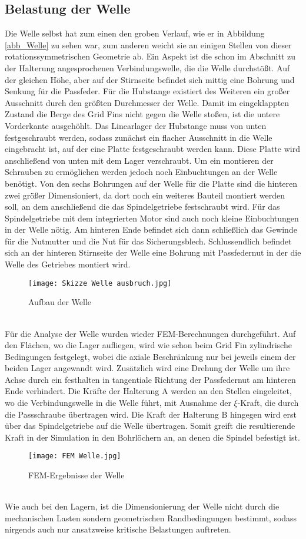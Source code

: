 \subsection{Belastung der Welle}
Die Welle selbst hat zum einen den groben Verlauf, wie er in Abbildung \ref{abb_Welle} zu sehen war, zum anderen weicht sie an einigen Stellen von dieser rotationssymmetrischen Geometrie ab. Ein Aspekt ist die schon im Abschnitt zu der Halterung angesprochenen Verbindungswelle, die die Welle durchstößt. Auf der gleichen Höhe, aber auf der Stirnseite befindet sich mittig eine Bohrung und Senkung für die Passfeder. Für die Hubstange existiert des Weiteren ein großer Ausschnitt durch den größten Durchmesser der Welle. Damit im eingeklappten Zustand die Berge des Grid Fins nicht gegen die Welle stoßen, ist die untere Vorderkante ausgehöhlt. Das Linearlager der Hubstange muss von unten festgeschraubt werden, sodass zunächst ein flacher Ausschnitt in die Welle eingebracht ist, auf der eine Platte festgeschraubt werden kann. Diese Platte wird anschließend von unten mit dem Lager verschraubt. Um ein montieren der Schrauben zu ermöglichen werden jedoch noch Einbuchtungen an der Welle benötigt. Von den sechs Bohrungen auf der Welle für die Platte sind die hinteren zwei größer Dimensioniert, da dort noch ein weiteres Bauteil montiert werden soll, an dem anschließend die das Spindelgetriebe festschraubt wird.
Für das Spindelgetriebe mit dem integrierten Motor sind auch noch kleine Einbuchtungen in der Welle nötig. Am hinteren Ende befindet sich dann schließlich das Gewinde für die Nutmutter und die Nut für das Sicherungsblech. Schlussendlich befindet sich an der hinteren Stirnseite der Welle eine Bohrung mit Passfedernut in der die Welle des Getriebes montiert wird.
\begin{figure}[h] 
	\centering
	\texttt{[image: Skizze Welle ausbruch.jpg]}
	\caption{Aufbau der Welle}
\end{figure}\\
Für die Analyse der Welle wurden wieder FEM-Berechnungen durchgeführt. Auf den Flächen, wo die Lager aufliegen, wird wie schon beim Grid Fin zylindrische Bedingungen festgelegt, wobei die axiale Beschränkung nur bei jeweils einem der beiden Lager angewandt wird. Zusätzlich wird eine Drehung der Welle um ihre Achse durch ein festhalten in tangentiale Richtung der Passfedernut am hinteren Ende verhindert.
Die Kräfte der Halterung A werden an den Stellen eingeleitet, wo die Verbindungswelle in die Welle führt, mit Ausnahme der $\xi$-Kraft, die durch die Passschraube übertragen wird. 
Die Kraft der Halterung B hingegen wird erst über das Spindelgetriebe auf die Welle übertragen. Somit greift die resultierende Kraft in der Simulation in den Bohrlöchern an, an denen die Spindel befestigt ist.
\begin{figure}[h] 
	\centering
	\texttt{[image: FEM Welle.jpg]}
	\caption{FEM-Ergebnisse der Welle}
	\label{abb_Well_FEM}
\end{figure}\\
Wie auch bei den Lagern, ist die Dimensionierung der Welle nicht durch die mechanischen Lasten sondern geometrischen Randbedingungen bestimmt, sodass nirgends auch nur ansatzweise kritische Belastungen auftreten.

